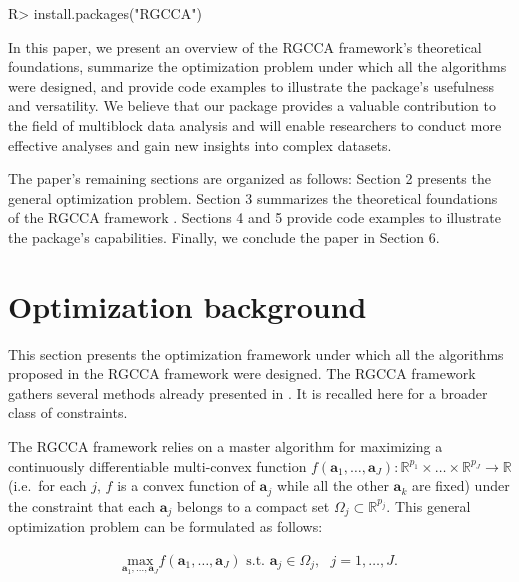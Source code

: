\documentclass[
]{jss}
\begin{document}
\footnotesize

\begin{CodeChunk}
\begin{CodeInput}
R> install.packages("RGCCA")
\end{CodeInput}
\end{CodeChunk}

\normalsize

In this paper, we present an overview of the RGCCA framework's
theoretical foundations, summarize the optimization problem under which
all the algorithms were designed, and provide code examples to
illustrate the package's usefulness and versatility. We believe that our
package provides a valuable contribution to the field of multiblock data
analysis and will enable researchers to conduct more effective analyses
and gain new insights into complex datasets.

The paper's remaining sections are organized as follows: Section 2
presents the general optimization problem. Section 3 summarizes the
theoretical foundations of the RGCCA framework
\cite{Tenenhaus2011, Tenenhaus2014, Tenenhaus2015, 
Tenenhaus2017}. Sections 4 and 5 provide code examples to illustrate the
package's capabilities. Finally, we conclude the paper in Section 6.

\hypertarget{optimization-background}{%
\section{Optimization background}\label{optimization-background}}

This section presents the optimization framework under which all the
algorithms proposed in the RGCCA framework were designed. The RGCCA
framework gathers several methods already presented in
\cite{Tenenhaus2011, Tenenhaus2014, Tenenhaus2015, Tenenhaus2017}. It is
recalled here for a broader class of constraints.

The RGCCA framework relies on a master algorithm for maximizing a
continuously differentiable multi-convex function
\(f( \mathbf a_1, \ldots, \mathbf a_J):\mathbb{R}^{p_1}\times \ldots \times \mathbb{R}^{p_J} \xrightarrow{}\mathbb{R}\)
(i.e.~for each \(j\), \(f\) is a convex function of \(\mathbf a_j\)
while all the other \(\mathbf a_k\) are fixed) under the constraint that
each \(\mathbf a_j\) belongs to a compact set
\(\Omega_j\subset \mathbb{R}^{p_j}\). This general optimization problem
can be formulated as follows:

\begin{align}
\underset{ \mathbf a_1, \ldots, \mathbf a_J}{\text{max}} f( \mathbf a_1, \ldots, \mathbf a_J)
\text{ s.t. }  \mathbf a_j \in \Omega_j, \text{ } j = 1, \ldots, J.
\label{master_optim}
\end{align}
\end{document}
